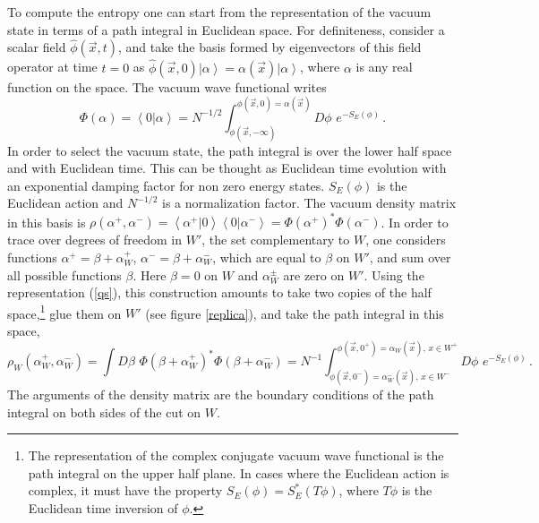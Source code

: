 \documentclass[11pt,a4paper]{article}
\numberwithin{equation}{section}
\begin{document}
To compute the entropy one can start from the representation of the vacuum state in terms of a path integral in Euclidean space.  For definiteness, consider a scalar field $\hat{\phi}(\vec{x},t)$, and take the basis formed by eigenvectors of this field operator at time $t=0$ as $\hat{\phi} (\vec{x},0) \left|  \alpha\right>= \alpha(\vec{x})\left|  \alpha\right>$, where $\alpha$ is any real function on the space. The vacuum wave functional writes   
\begin{equation}
\Phi(\alpha)=\left<0|\alpha\right>=N^{-1/2}\int_{\phi(\vec{x},-\infty)}^{\phi(\vec{x},0)=\alpha(\vec{x})} D\phi\,\, e^{-S_E(\phi)}\,. \label{qs}
\end{equation} 
In order to select the vacuum state, the path integral is over the lower half space and with Euclidean time. This can be thought as Euclidean time evolution with an exponential damping factor for non zero energy states.  $S_E(\phi)$ is the Euclidean action and $N^{-1/2}$ is a normalization factor. The vacuum density matrix in this basis is
$\rho(\alpha^+,\alpha^-)=\left<\alpha^+ | 0\right> \left< 0| \alpha^-\right>=\Phi(\alpha^+)^*\Phi(\alpha^-)$. In order to trace over degrees of freedom in $W'$, the set complementary to $W$, one considers functions $\alpha^+=\beta + \alpha_{W}^+$, $\alpha^-=\beta+ \alpha^-_{W}$, which are equal to $\beta$ on $W'$, and sum over all possible functions $\beta$. Here $\beta=0$ on $W$ and $\alpha^\pm_W$ are zero on $W'$.  Using the representation (\ref{qs}), this construction amounts to take two copies of the half space,\footnote{The representation of the complex conjugate vacuum wave functional is the path integral on the upper half plane. In cases where the Euclidean action is complex, it must have the property $S_E(\phi)=S_E^*(T\phi)$, where $T\phi$ is the Euclidean time inversion of $\phi$.} glue them on $W'$ (see figure \ref{replica}), and take the path integral in this space,
\begin{equation}
\rho_W(\alpha_{W}^+,\alpha^-_{W})=\int D\beta\,\, \Phi(\beta + \alpha_{W}^+)^* \Phi(\beta+ \alpha^-_{W})= N^{-1}\int_{\phi(\vec{x},0^-)=\alpha^-_W(\vec{x}),\, x\in W^- }^{\phi(\vec{x},0^+)=\alpha_W(\vec{x}),\,x\in W^+} D\phi\,\, e^{-S_E(\phi)}\,. \label{opre}
\end{equation}
The arguments of the density matrix are the boundary conditions of the path integral on both sides of the cut on $W$. 
\end{document}

